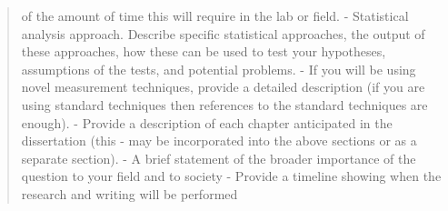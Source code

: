 \documentclass[11pt]{article}
\begin{document}
\begin{quote}
of the amount of time this will require in the lab or field. -
Statistical analysis approach. Describe specific statistical approaches,
the output of these approaches, how these can be used to test your
hypotheses, assumptions of the tests, and potential problems. - If you
will be using novel measurement techniques, provide a detailed
description (if you are using standard techniques then references to the
standard techniques are enough). - Provide a description of each chapter
anticipated in the dissertation (this - may be incorporated into the
above sections or as a separate section). - A brief statement of the
broader importance of the question to your field and to society -
Provide a timeline showing when the research and writing will be
performed
\end{quote}
\end{document}

